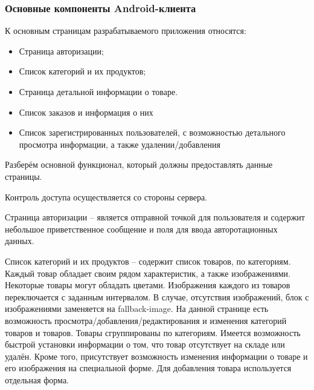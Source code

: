 
\subsubsection{Основные компоненты Android-клиента}

К основным страницам разрабатываемого приложения относятся:

\begin{itemize}
    \item Страница авторизации;
    \item Список категорий и их продуктов;
    \item Страница детальной информации о товаре.
    \item Список заказов и информация о них
    \item Список зарегистрированных пользователей, с возможностью детального просмотра информации, а также удалении/добавления
\end{itemize}

Разберём основной функционал, который должны предоставлять данные страницы.

Контроль доступа осуществляется со стороны сервера.

Страница авторизации – является отправной точкой для пользователя и содержит небольшое приветственное сообщение и поля для ввода авторотационных данных.

Список категорий и их продуктов – содержит список товаров, по категориям.
Каждый товар обладает своим рядом характеристик, а также изображениями.
Некоторые товары могут обладать цветами.
Изображения каждого из товаров переключается с заданным интервалом.
В случае, отсутствия изображений, блок с изображениями заменяется на fallback-image.
На данной странице есть возможность просмотра/добавления/редактирования и изменения категорий товаров и товаров.
Товары сгруппированы по категориям.
Имеется возможность быстрой установки информации о том, что товар отсутствует на складе или удалён.
Кроме того, присутствует возможность изменения информации о товаре и его изображения на специальной форме.
Для добавления товара используется отдельная форма.
